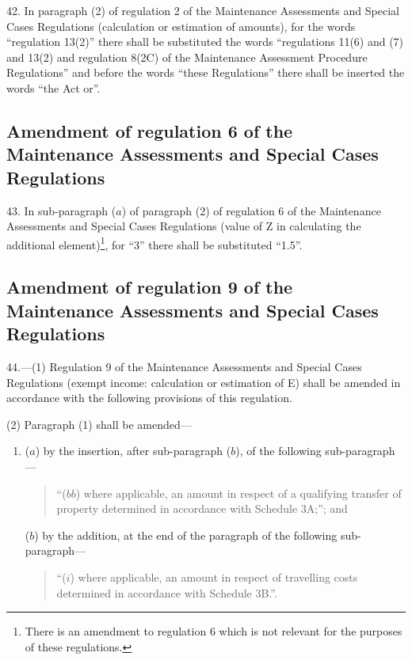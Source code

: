 \documentclass[12pt,a4paper]{article}
\begin{document}
42.  In paragraph (2) of regulation 2 of the Maintenance Assessments and Special Cases Regulations (calculation or estimation of amounts), for the words “regulation 13(2)” there shall be substituted the words “regulations 11(6) and (7) and 13(2) and regulation 8(2C) of the Maintenance Assessment Procedure Regulations” and before the words “these Regulations” there shall be inserted the words “the Act or”.

\subsection[43. Amendment of regulation 6 of the Maintenance Assessments and Special Cases Regulations]{\sloppy Amendment of regulation 6 of the Maintenance Assessments and Special Cases Regulations}

43.  In sub-paragraph ($a$) of paragraph (2) of regulation 6 of the Maintenance Assessments and Special Cases Regulations (value of Z in calculating the additional element)\footnote{\frenchspacing There is an amendment to regulation 6 which is not relevant for the purposes of these regulations.}, for “3” there shall be substituted “1.5”.

\subsection[44. Amendment of regulation 9 of the Maintenance Assessments and Special Cases Regulations]{\sloppy Amendment of regulation 9 of the Maintenance Assessments and Special Cases Regulations}

44.—(1) Regulation 9 of the Maintenance Assessments and Special Cases Regulations (exempt income: calculation or estimation of E) shall be amended in accordance with the following provisions of this regulation.

(2) Paragraph (1) shall be amended—
\begin{enumerate}\item[]
($a$) by the insertion, after sub-paragraph ($b$), of the following sub-\hspace{0pt}paragraph—
\begin{quotation}
“($bb$) where applicable, an amount in respect of a qualifying transfer of property determined in accordance with Schedule 3A;”; and
\end{quotation}

($b$) by the addition, at the end of the paragraph of the following sub-paragraph—
\begin{quotation}
“($i$) where applicable, an amount in respect of travelling costs determined in accordance with Schedule 3B.”.
\end{quotation}
\end{enumerate}
\end{document}
